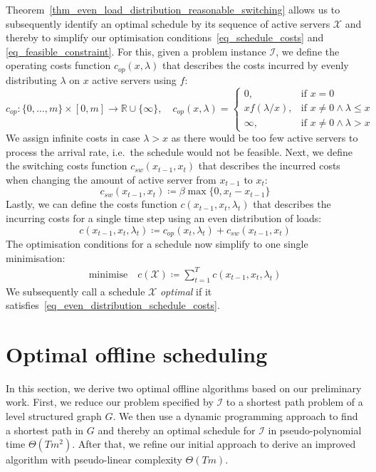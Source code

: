 \documentclass[hidelinks]{article}
\theoremstyle{plain}
\theoremstyle{definition}
\theoremstyle{rem}
\newcommand{\mx}{\mathcal{X}}
\newcommand{\inp}{\mathcal{I}}
\newcommand{\costs}{c}
\newcommand{\opcosts}{c_{op}}
\newcommand{\swcosts}{c_{sw}}
\newcommand{\fromto}[2]{\{#1,\ldots,#2\}}
\begin{document}
Theorem~\ref{thm_even_load_distribution_reasonable_switching} allows us to subsequently identify an optimal schedule by its sequence of active servers $\mx$ and thereby to simplify our optimisation conditions~\eqref{eq_schedule_costs} and \eqref{eq_feasible_constraint}. 
For this, given a problem instance $\inp$, we define the operating costs function $\opcosts(x,\lambda)$ that describes the costs incurred by evenly distributing $\lambda$ on $x$ active servers using $f$:
\begin{equation*}
	\opcosts:\fromto{0}{m}\times[0,m]\rightarrow\mathbb{R}\cup\{\infty\},\quad \opcosts(x,\lambda)=\begin{cases}
          0, & \text{if $x=0$}\\
	  x f(\lambda/x), & \text{if $x\ne 0\land\lambda\le x$}\\
	  \infty, & \text{if $x\ne 0\land\lambda>x$}
	  \end{cases} \label{fct:c}
\end{equation*}
We assign infinite costs in case $\lambda>x$ as there would be too few active servers to process the arrival rate, i.e.\ the schedule would not be feasible. Next, we define the switching costs function $\swcosts(x_{t-1},x_t)$ that describes the incurred costs when changing the amount of active server from $x_{t-1}$ to $x_t$:
\begin{equation*}
	\swcosts(x_{t-1},x_t)\coloneqq\beta\max\{0,x_t-x_{t-1}\}
\end{equation*}
Lastly, we can define the costs function $\costs(x_{t-1},x_t,\lambda_t)$ that describes the incurring costs for a single time step using an even distribution of loads:
\begin{equation*}
	\costs(x_{t-1},x_{t},\lambda_t)\coloneqq\opcosts(x_t,\lambda_t)+\swcosts(x_{t-1},x_t)
\end{equation*}
The optimisation conditions for a schedule now simplify to one single minimisation:
\begin{align}
	\text{minimise}\quad \costs(\mx)\coloneqq\sum\limits_{t=1}^{T}\costs(x_{t-1},x_{t},\lambda_t)\label{eq_even_distribution_schedule_costs}
\end{align}
We subsequently call a schedule $\mx$ \textit{optimal} if it satisfies~\eqref{eq_even_distribution_schedule_costs}.

\section{Optimal offline scheduling}
In this section, we derive two optimal offline algorithms based on our preliminary work.
First, we reduce our problem specified by $\inp$ to a shortest path problem of a level structured graph $G$. We then use a dynamic programming approach to find a shortest path in $G$ and thereby an optimal schedule for $\inp$ in pseudo-polynomial time $\Theta(Tm^2)$.
After that, we refine our initial approach to derive an improved algorithm with pseudo-linear complexity $\Theta(Tm)$.
\end{document}
